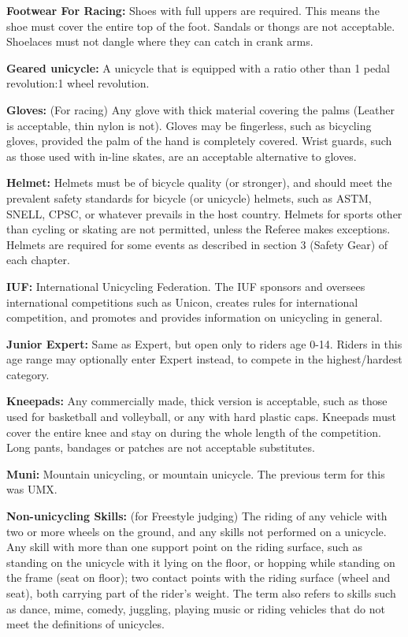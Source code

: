 \textbf{Footwear For Racing:} Shoes with full uppers are required.
This means the shoe must cover the entire top of the foot.
Sandals or thongs are not acceptable.
Shoelaces must not dangle where they can catch in crank arms.

\textbf{Geared unicycle:} A unicycle that is equipped with a ratio other than 1 pedal revolution:1 wheel revolution.

\textbf{Gloves:} (For racing) Any glove with thick material covering the palms (Leather is acceptable, thin nylon is not).
Gloves may be fingerless, such as bicycling gloves, provided the palm of the hand is completely covered.
Wrist guards, such as those used with in-line skates, are an acceptable alternative to gloves.

\textbf{Helmet:} Helmets must be of bicycle quality (or stronger), and should meet the prevalent safety standards for bicycle (or unicycle) helmets, such as ASTM, SNELL, CPSC, or whatever prevails in the host country.
Helmets for sports other than cycling or skating are not permitted, unless the Referee makes exceptions.
Helmets are required for some events as described in section 3 (Safety Gear) of each chapter.

\textbf{IUF:} International Unicycling Federation.
The IUF sponsors and oversees international competitions such as Unicon, creates rules for international competition, and promotes and provides information on unicycling in general.

\textbf{Junior Expert:} Same as Expert, but open only to riders age 0-14.
Riders in this age range may optionally enter Expert instead, to compete in the highest/hardest category.

\textbf{Kneepads:} Any commercially made, thick version is acceptable, such as those used for basketball and volleyball, or any with hard plastic caps.
Kneepads must cover the entire knee and stay on during the whole length of the competition.
Long pants, bandages or patches are not acceptable substitutes.

\textbf{Muni:} Mountain unicycling, or mountain unicycle.
The previous term for this was UMX.

\textbf{Non-unicycling Skills:} (for Freestyle judging) The riding of any vehicle with two or more wheels on the ground, and any skills not performed on a unicycle.
Any skill with more than one support point on the riding surface, such as standing on the unicycle with it lying on the floor, or hopping while standing on the frame (seat on floor); two contact points with the riding surface (wheel and seat), both carrying part of the rider's weight.
The term also refers to skills such as dance, mime, comedy, juggling, playing music or riding vehicles that do not meet the definitions of unicycles.


